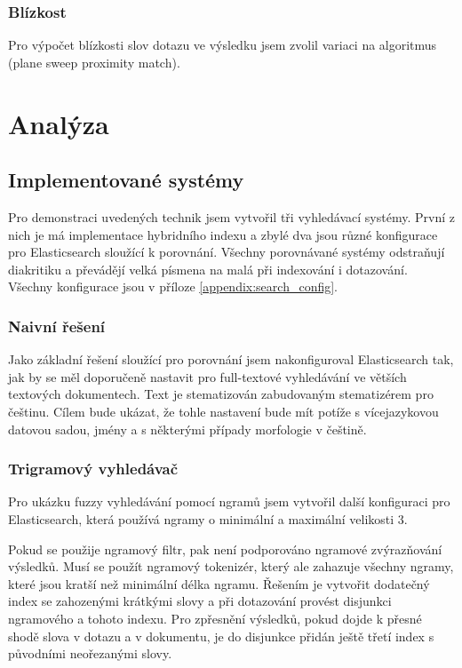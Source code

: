 \documentclass[11pt,letterpaper,oneside,openright]{book}
\begin{document}
\subsection{Blízkost}
Pro výpočet blízkosti slov dotazu ve výsledku jsem zvolil variaci na algoritmus
(plane sweep proximity match).


\chapter{Analýza}
\section{Implementované systémy}
Pro demonstraci uvedených technik jsem vytvořil tři vyhledávací systémy. První
z nich je má implementace hybridního indexu a zbylé dva jsou různé konfigurace
pro Elasticsearch sloužící k porovnání. Všechny porovnávané systémy odstraňují
diakritiku a převádějí velká písmena na malá při indexování i dotazování.
Všechny konfigurace jsou v příloze \ref{appendix:search_config}.

\subsection{Naivní řešení}
Jako základní řešení sloužící pro porovnání jsem nakonfiguroval Elasticsearch
tak, jak by se měl doporučeně nastavit pro full-textové vyhledávání ve větších
textových dokumentech. Text je stematizován zabudovaným stematizérem pro
češtinu. Cílem bude ukázat, že tohle nastavení bude mít potíže s vícejazykovou
datovou sadou, jmény a s některými případy morfologie v češtině.

\subsection{Trigramový vyhledávač}
Pro ukázku fuzzy vyhledávání pomocí ngramů jsem vytvořil další konfiguraci pro
Elasticsearch, která používá ngramy o minimální a maximální velikosti 3.

Pokud se použije ngramový filtr, pak není podporováno ngramové zvýrazňování
výsledků. Musí se použít ngramový tokenizér, který ale zahazuje všechny ngramy,
které jsou kratší než minimální délka ngramu. Řešením je vytvořit dodatečný
index se zahozenými krátkými slovy a při dotazování provést disjunkci
ngramového a tohoto indexu. Pro zpřesnění výsledků, pokud dojde k přesné shodě
slova v dotazu a v dokumentu, je do disjunkce přidán ještě třetí index s
původními neořezanými slovy.
\end{document}
